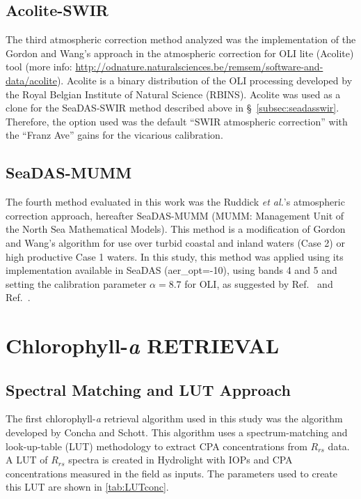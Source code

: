 \documentclass[draft]{spie}  %
\begin{document}
\subsection{Acolite-SWIR}
The third atmospheric correction method analyzed was the implementation of the Gordon and Wang\cite{Gordon:1994}'s approach in the atmospheric correction for OLI lite (Acolite) tool (more info: \url{http://odnature.naturalsciences.be/remsem/software-and-data/acolite}). Acolite is a binary distribution of the OLI processing developed by the Royal Belgian Institute of Natural Science (RBINS). Acolite was used as a clone for the SeaDAS-SWIR method described above in \S~\ref{subsec:seadasswir}. Therefore, the option used was the default ``SWIR atmospheric correction'' with the ``Franz Ave'' gains for the vicarious calibration\cite{Franz:2015}.
\subsection{SeaDAS-MUMM}
The fourth method evaluated in this work was the Ruddick {\it et al.}'s atmospheric correction approach\cite{Ruddick:2000bs}, hereafter SeaDAS-MUMM (MUMM: Management Unit of the North Sea Mathematical Models). This method is a modification of Gordon and Wang's algorithm\cite{Gordon:1994} for use over turbid coastal and inland waters (Case 2) or high productive Case 1 waters. In this study, this method was applied using its implementation available in SeaDAS (aer\_opt=-10), using bands 4 and 5 and setting the calibration parameter $\alpha=8.7$ for OLI, as suggested by Ref.~ and Ref.~. 


\section{Chlorophyll-{\it a} RETRIEVAL}
\label{sec:chlretrieval}
\subsection{Spectral Matching and LUT Approach}
\label{subsec:LUTapproach}
The first chlorophyll-{\it a} retrieval algorithm used in this study was the algorithm developed by Concha and Schott\cite{Concha2013IGARSS}. This algorithm uses a spectrum-matching and look-up-table (LUT) methodology to extract CPA concentrations from $R_{rs}$ data. A LUT of $R_{rs}$ spectra is created in Hydrolight\cite{MobleyHE} with IOPs and CPA concentrations measured in the field as inputs. The parameters used to create this LUT are shown in \autoref{tab:LUTconc}.
\end{document}
